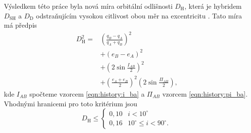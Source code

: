 Výsledkem této práce byla nová míra orbitální odlišnosti $D_\text{H}$, která je hybridem $D_\text{SH}$ a $D_\text{D}$ odstraňujícím vysokou citlivost obou měr na excentricitu \cite{remarks}. Tato míra má předpis \cite{remarks}
\begin{equation}
    \begin{aligned}
        D_\text{H}^2= & \left( \frac{q_B-q_A}{q_A+q_B} \right)^2                                    \\
                      & +\left( e_B-e_A \right)^2                                                   \\
                      & +\left( 2\sin{\frac{I_{AB}}{2}} \right)^2                                   \\
                      & +\left( \frac{e_A+e_B}{2} \right)^2\left( 2\sin{\frac{\Pi_{AB}}{2}} \right) \text{,}
    \end{aligned}
    \label{eqn:revised:d_h}
\end{equation}
kde $I_{AB}$ spočteme vzorcem \eqref{eqn:history:i_ba} a $\Pi_{AB}$ vzorcem \eqref{eqn:history:pi_ba}. Vhodnými hranicemi pro toto kritérium jsou \cite{galligan}
$$
    D_\text{H} \le \begin{cases}
        0{,}10 & i < 10^\circ \\
        0{,}16 & 10^\circ \le i < 90^\circ \text{.}
    \end{cases}
$$